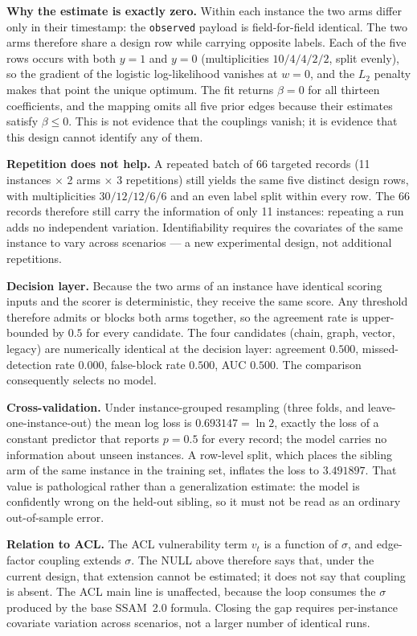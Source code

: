 \documentclass[11pt]{article}
\begin{document}
\textbf{Why the estimate is exactly zero.} Within each instance the two arms
differ only in their timestamp: the \texttt{observed} payload is
field-for-field identical. The two arms therefore share a design row while
carrying opposite labels. Each of the five rows occurs with both $y=1$ and
$y=0$ (multiplicities $10/4/4/2/2$, split evenly), so the gradient of the
logistic log-likelihood vanishes at $w=0$, and the $L_2$ penalty makes that
point the unique optimum. The fit returns $\beta=0$ for all thirteen
coefficients, and the mapping omits all five prior edges because their
estimates satisfy $\beta\le0$. This is not evidence that the couplings
vanish; it is evidence that this design cannot identify any of them.

\textbf{Repetition does not help.} A repeated batch of 66 targeted records
(11 instances $\times$ 2 arms $\times$ 3 repetitions) still yields the same
five distinct design rows, with multiplicities $30/12/12/6/6$ and an even
label split within every row. The 66 records therefore still carry the
information of only 11 instances: repeating a run adds no independent
variation. Identifiability requires the covariates of the same instance to
vary across scenarios --- a new experimental design, not additional
repetitions.

\textbf{Decision layer.} Because the two arms of an instance have identical
scoring inputs and the scorer is deterministic, they receive the same score.
Any threshold therefore admits or blocks both arms together, so the
agreement rate is upper-bounded by $0.5$ for every candidate. The four
candidates (chain, graph, vector, legacy) are numerically identical at the
decision layer: agreement $0.500$, missed-detection rate $0.000$,
false-block rate $0.500$, AUC $0.500$. The comparison consequently selects
no model.

\textbf{Cross-validation.} Under instance-grouped resampling (three folds,
and leave-one-instance-out) the mean log loss is $0.693147=\ln 2$, exactly
the loss of a constant predictor that reports $p=0.5$ for every record; the
model carries no information about unseen instances. A row-level split,
which places the sibling arm of the same instance in the training set,
inflates the loss to $3.491897$. That value is pathological rather than a
generalization estimate: the model is confidently wrong on the held-out
sibling, so it must not be read as an ordinary out-of-sample error.

\textbf{Relation to ACL.} The ACL vulnerability term $v_t$ is a function of
$\sigma$, and edge-factor coupling extends $\sigma$. The NULL above
therefore says that, under the current design, that extension cannot be
estimated; it does not say that coupling is absent. The ACL main line is
unaffected, because the loop consumes the $\sigma$ produced by the base
SSAM~2.0 formula. Closing the gap requires per-instance covariate variation
across scenarios, not a larger number of identical runs.
\end{document}
